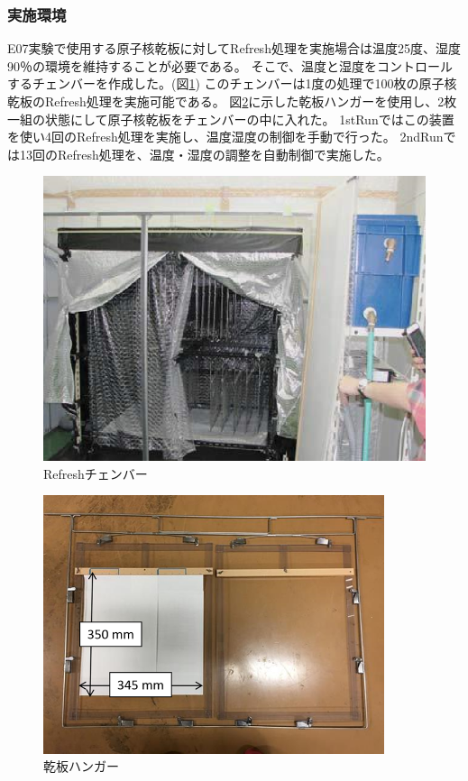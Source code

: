 \documentclass[12pt,a4paper]{jarticle}
\begin{document}
\subsubsection{実施環境}
E07実験で使用する原子核乾板に対してRefresh処理を実施場合は温度25度、湿度90％の環境を維持することが必要である。\cite{oohashi}
そこで、温度と湿度をコントロールするチェンバーを作成した。(図\ref{fig:refresh_masi-nn})
 このチェンバーは1度の処理で100枚の原子核乾板のRefresh処理を実施可能である。
図\ref{fig:refresh_hanga__}に示した乾板ハンガーを使用し、2枚一組の状態にして原子核乾板をチェンバーの中に入れた。
1stRunではこの装置を使い4回のRefresh処理を実施し、温度湿度の制御を手動で行った。
2ndRunでは13回のRefresh処理を、温度・湿度の調整を自動制御で実施した。\cite{muramoto}
\begin{figure}[htbp]
  \centering
     \includegraphics[width=140mm]{refresh_chember.png}
  \caption{Refreshチェンバー\label{fig:refresh_masi-nn}}
\end{figure}
\begin{figure}[htbp]
  \centering
     \includegraphics[width=100mm]{refresh_hanga.png}
  \caption{乾板ハンガー\label{fig:refresh_hanga__}}
\end{figure}
\end{document}
